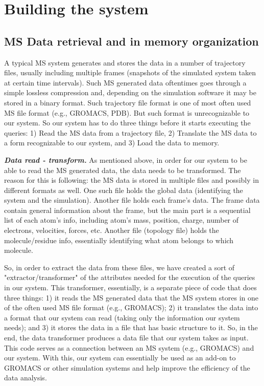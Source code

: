 \documentclass[10pt,journal,final,letterpaper,twocolumn]{IEEEtran}
\begin{document}
\section{Building the system}\label{sc:system}

\subsection{MS Data retrieval and in memory organization}

A typical MS system generates and stores the data in a number of
trajectory files, usually including multiple frames (snapshots of
the simulated system taken at certain time intervals). Such MS
generated data oftentimes goes through a simple lossless compression
and, depending on the simulation software it may be stored in a
binary format. Such trajectory file format is one of most often used
MS file format (e.g., GROMACS, PDB). But such format is
unrecognizable to our system. So our system has to do three things
before it starts executing the queries: 1) Read the MS data from a
trajectory file, 2) Translate the MS data to a form recognizable to
our system, and 3) Load the data to memory.

\emph{\textbf{Data read - transform.}} As mentioned above, in order
for our system to be able to read the MS generated data, the data
needs to be transformed. The reason for this is following: the MS
data is stored in multiple files and possibly in different formats
as well. One such file holds the global data (identifying the system
and the simulation). Another file holds each frame's data. The frame
data contain general information about the frame, but the main part
is a sequential list of each atom's info, including atom's mass,
position, charge, number of electrons, velocities, forces, etc.
Another file (topology file) holds the molecule/residue info,
essentially identifying what atom belongs to which molecule.

So, in order to extract the data from these files, we have created a
sort of "extractor/transformer" of the attributes needed for the
execution of the queries in our system. This transformer,
essentially, is a separate piece of code that does three things: 1)
it reads the MS generated data that the MS system stores in one of
the often used MS file format (e.g., GROMACS); 2) it translates the
data into a format that our system can read (taking only the
information our system needs); and 3) it stores the data in a file
that has basic structure to it. So, in the end, the data transformer
produces a data file that our system takes as input. This code
serves as a connection between an MS system (e.g., GROMACS) and our
system. With this, our system can essentially be used as an add-on
to GROMACS or other simulation systems and help improve the
efficiency of the data analysis.
\end{document}
